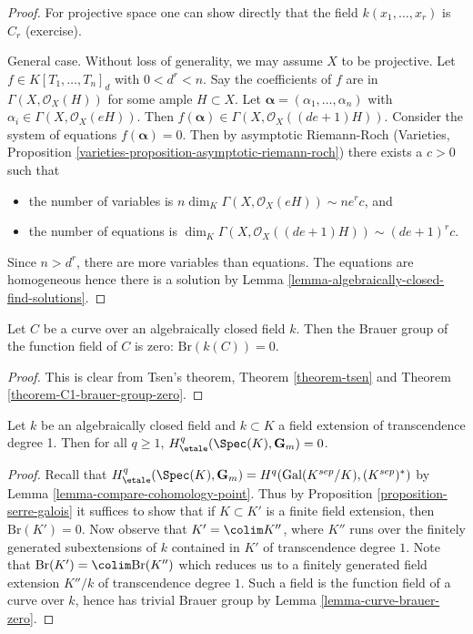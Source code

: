 \begin{proof}
For projective space one can show directly that the field
$k(x_1, \ldots, x_r)$ is $C_r$ (exercise).

\medskip\noindent
General case. Without loss of generality, we may assume $X$ to be projective.
Let $f \in K[T_1, \ldots, T_n]_d$ with $0 < d^r <n$. Say the coefficients of $f$
are in $\Gamma(X, \mathcal{O}_X(H))$ for some ample $H \subset X$. Let
$\mathbf{\alpha} = (\alpha_1, \ldots, \alpha_n)$ with $\alpha_i \in \Gamma(X,
\mathcal{O}_X(eH))$. Then $f(\mathbf{\alpha}) \in \Gamma(X,
\mathcal{O}_X((de+1)H))$. Consider the system of equations $f(\mathbf{\alpha})
=0$. Then by asymptotic Riemann-Roch
(Varieties, Proposition \ref{varieties-proposition-asymptotic-riemann-roch})
there exists a $c > 0$ such that
\begin{itemize}
\item the number of variables is
$n\dim_K \Gamma(X, \mathcal{O}_X(eH)) \sim n e^r c$, and
\item the number of equations is
$\dim_K \Gamma(X, \mathcal{O}_X((de+1)H)) \sim (de+1)^r c$.
\end{itemize}
Since $n> d^r$, there are more variables than equations. The equations are
homogeneous hence there is a solution by
Lemma \ref{lemma-algebraically-closed-find-solutions}.
\end{proof}

\begin{lemma}
\label{lemma-curve-brauer-zero}
Let $C$ be a curve over an algebraically closed field $k$. Then
the Brauer group of the function field of $C$ is zero:
$\text{Br}(k(C)) = 0$.
\end{lemma}

\begin{proof}
This is clear from Tsen's theorem,
Theorem \ref{theorem-tsen} and
Theorem \ref{theorem-C1-brauer-group-zero}.
\end{proof}

\begin{lemma}
\label{lemma-cohomology-Gm-function-field-curve}
Let $k$ be an algebraically closed field and $k \subset K$ a field extension
of transcendence degree 1. Then for all $q \geq 1$,
$H_\etale^q(\Spec(K), \mathbf{G}_m) = 0$.
\end{lemma}

\begin{proof}
Recall that
$H_\etale^q(\Spec(K), \mathbf{G}_m) = H^q(\text{Gal}(K^{sep}/K), (K^{sep})^*)$
by Lemma \ref{lemma-compare-cohomology-point}.
Thus by Proposition \ref{proposition-serre-galois}
it suffices to show that if $K \subset K'$ is a finite field extension, then
$\text{Br}(K') = 0$. Now observe that $K' = \colim K''$, where $K''$ runs
over the finitely generated subextensions of $k$ contained in $K'$ of
transcendence degree $1$.
Note that $\text{Br}(K') = \colim \text{Br}(K'')$ which reduces us
to a finitely generated field extension $K''/k$ of transcendence
degree $1$. Such a field is the function field of a curve over $k$,
hence has trivial Brauer group by
Lemma \ref{lemma-curve-brauer-zero}.
\end{proof}






